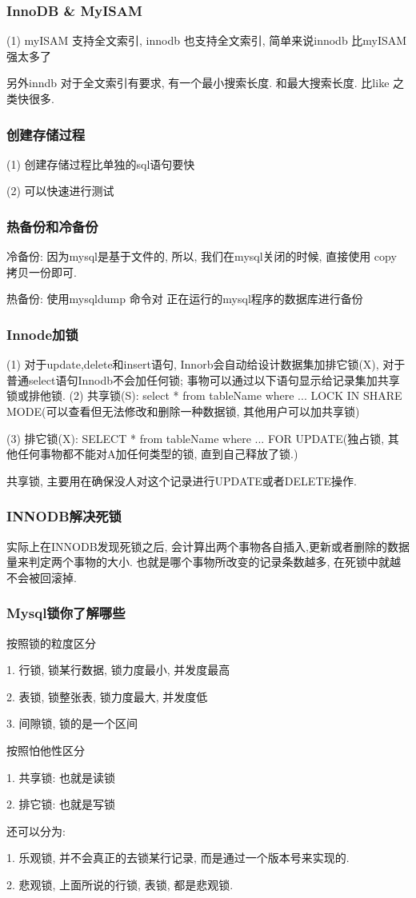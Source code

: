 \documentclass[UTF8]{ctexart}
\begin{document}
\subsubsection{InnoDB \& MyISAM}
(1) myISAM 支持全文索引, innodb 也支持全文索引, 简单来说innodb 比myISAM强太多了\par
另外inndb 对于全文索引有要求, 有一个最小搜索长度. 和最大搜索长度. 比like 之类快很多.
\subsubsection{创建存储过程}
(1) 创建存储过程比单独的sql语句要快\par
(2) 可以快速进行测试
\subsubsection{热备份和冷备份}
冷备份: 因为mysql是基于文件的, 所以, 我们在mysql关闭的时候, 直接使用 copy 拷贝一份即可. \par
热备份: 使用mysqldump 命令对 正在运行的mysql程序的数据库进行备份
\subsubsection{Innode加锁}
(1) 对于update,delete和insert语句, Innorb会自动给设计数据集加排它锁(X), 对于普通select语句Innodb不会加任何锁; 事物可以通过以下语句显示给记录集加共享锁或排他锁.
(2) 共享锁(S): select * from tableName where ... LOCK IN SHARE MODE(可以查看但无法修改和删除一种数据锁, 其他用户可以加共享锁) \par
(3) 排它锁(X): SELECT * from tableName where ... FOR UPDATE(独占锁, 其他任何事物都不能对A加任何类型的锁, 直到自己释放了锁.) \par
共享锁, 主要用在确保没人对这个记录进行UPDATE或者DELETE操作.
\subsubsection{INNODB解决死锁}
实际上在INNODB发现死锁之后, 会计算出两个事物各自插入,更新或者删除的数据量来判定两个事物的大小. 也就是哪个事物所改变的记录条数越多, 在死锁中就越不会被回滚掉.
\subsubsection{Mysql锁你了解哪些}
按照锁的粒度区分 \par
1. 行锁, 锁某行数据, 锁力度最小, 并发度最高 \par
2. 表锁, 锁整张表, 锁力度最大, 并发度低 \par
3. 间隙锁, 锁的是一个区间 \par
按照怕他性区分 \par
1. 共享锁: 也就是读锁 \par
2. 排它锁: 也就是写锁 \par
还可以分为: \par
1. 乐观锁, 并不会真正的去锁某行记录, 而是通过一个版本号来实现的. \par
2. 悲观锁, 上面所说的行锁, 表锁, 都是悲观锁. \par
\end{document}
